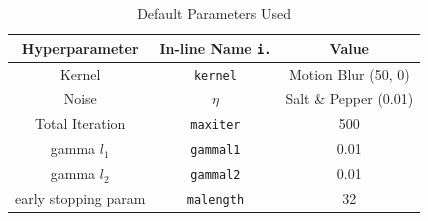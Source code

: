 \documentclass{article}
\theoremstyle{definition}
\theoremstyle{remark}
\begin{document}
\begin{table}[h!]
    \centering
    \caption{Default Parameters Used}
    \vspace{7pt} %
    \renewcommand{\arraystretch}{1.5}
    \begin{tabular}{|c|c|c|}
        \hline
        \textbf{Hyperparameter} & \textbf{In-line Name \texttt{i.}} & \textbf{Value} \\
        \hline
        Kernel & \texttt{kernel} & Motion Blur (50, 0) \\
        \hline
        Noise & $\eta$ & Salt \& Pepper (0.01) \\
        \hline
        Total Iteration & \texttt{maxiter} & 500 \\
        \hline
        gamma $l_1$ & \texttt{gammal1} & 0.01 \\
        \hline
        gamma $l_2$ & \texttt{gammal2} & 0.01 \\
        \hline
        early stopping param & \texttt{malength} & 32 \\
        \hline
    \end{tabular}
\end{table}
\end{document}

